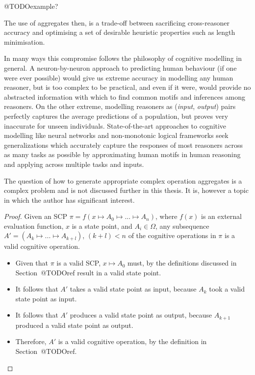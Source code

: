 \documentclass[
11pt, %
english, %
singlespacing, %
headsepline, %
]{MastersDoctoralThesis} %
\newtheorem{proof}{Proof}
\begin{document}
@TODOexample?

The use of aggregates then, is a trade-off between sacrificing cross-reasoner accuracy and optimising a set of desirable heuristic properties such as length minimisation.

In many ways this compromise follows the philosophy of cognitive modelling in general. A neuron-by-neuron approach to predicting human behaviour (if one were ever possible) would give us extreme accuracy in modelling any human reasoner, but is too complex to be practical, and even if it were, would provide no abstracted information with which to find common motifs and inferences among reasoners. On the other extreme, modelling reasoners as (\textit{input}, \textit{output}) pairs perfectly captures the average predictions of a population, but proves very inaccurate for unseen individuals. State-of-the-art approaches to cognitive modelling like neural networks and non-monotonic logical frameworks seek generalizations which accurately capture the responses of most reasoners across as many tasks as possible by approximating human motifs in human reasoning and applying across multiple tasks and inputs.

The question of how to generate appropriate complex operation aggregates is a complex problem and is not discussed further in this thesis. It is, however a topic in which the author has significant interest.

\begin{proof} \label{proof:aggregateValid}
Given an SCP $\pi= f(x \longmapsto A_0 \longmapsto ... \longmapsto A_n)$, where $f(x)$ is an external evaluation function, $x$ is a state point, and $A_i \in \Omega$, any subsequence $A'=(A_k \longmapsto ... \longmapsto A_{k+l})$, $(k+l)<n$ of the cognitive operations in $\pi$ is a valid cognitive operation.
\begin{itemize}
\item Given that $\pi$ is a valid SCP, $x \longmapsto A_0$ must, by the definitions discussed in Section~@TODOref result in a valid state point.
\item It follows that $A'$ takes a valid state point as input, because $A_k$ took a valid state point as input.
\item It follows that $A'$ produces a valid state point as output, because $A_{k+1}$ produced a valid state point as output.
\item Therefore, $A'$ is a valid cognitive operation, by the definition in Section~@TODOref.
\end{itemize}
\end{proof}
\end{document}
